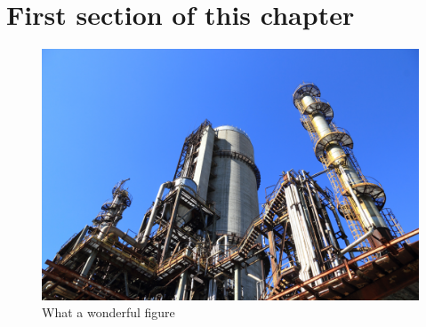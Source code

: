\section{First section of this chapter}

\begin{figure}[h]
    \includegraphics[width=\linewidth]{figures/sample.jpg}
    \caption{What a wonderful figure}
    \label{fig:sample}
\end{figure}
